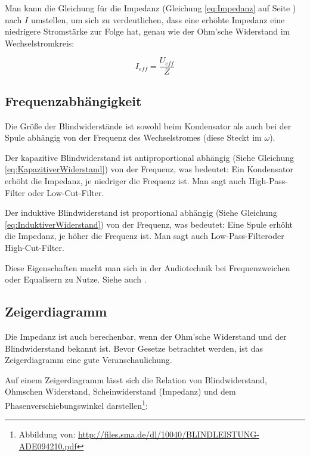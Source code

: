 Man kann die Gleichung für die Impedanz (Gleichung \ref{eq:Impedanz} auf Seite \pageref{eq:Impedanz}) nach $I$ umstellen, um sich zu verdeutlichen, dass eine erhöhte Impedanz eine niedrigere Stromstärke zur Folge hat, genau wie der Ohm'sche Widerstand im Wechselstromkreis:

\begin{equation}	\label{eq:ImitZ}
	I_{eff}=\frac{U_{eff}}{Z}
\end{equation}


\subsection{Frequenzabhängigkeit}	\label{subsec:Frequenzabhaengigkeit}

Die Größe der Blindwiderstände ist sowohl beim Kondensator als auch bei der Spule abhängig von der Frequenz des Wechselstromes (diese Steckt im $\omega$).

Der kapazitive Blindwiderstand ist antiproportional abhängig (Siehe Gleichung \ref{eq:KapazitiverWiderstand}) von der Frequenz, was bedeutet: \glqq Ein Kondensator erhöht die Impedanz, je niedriger die Frequenz ist.\grqq{} Man sagt auch \glqq High-Pass-Filter\grqq{} oder \glqq Low-Cut-Filter\grqq .

Der induktive Blindwiderstand ist proportional abhängig (Siehe Gleichung \ref{eq:InduktiverWiderstand}) von der Frequenz, was bedeutet: \glqq Eine Spule erhöht die Impedanz, je höher die Frequenz ist.\grqq{} Man sagt auch \glqq Low-Pass-Filter\grqq oder \glqq High-Cut-Filter\grqq .

Diese Eigenschaften macht man sich in der Audiotechnik bei Frequenzweichen oder Equalisern zu Nutze. Siehe auch .



\subsection{Zeigerdiagramm}	\label{subsec:WiderstaendeZeigerdiagram}

Die Impedanz ist auch berechenbar, wenn der Ohm'sche Widerstand und der Blindwiderstand bekannt ist. Bevor Gesetze betrachtet werden, ist das Zeigerdiagramm eine gute Veranschaulichung.

Auf einem Zeigerdiagramm lässt sich die Relation von Blindwiderstand, Ohmschen Widerstand, Scheinwiderstand (Impedanz) und dem Phasenverschiebungswinkel darstellen\footnote{Abbildung von: \url{http://files.sma.de/dl/10040/BLINDLEISTUNG-ADE094210.pdf}}:

